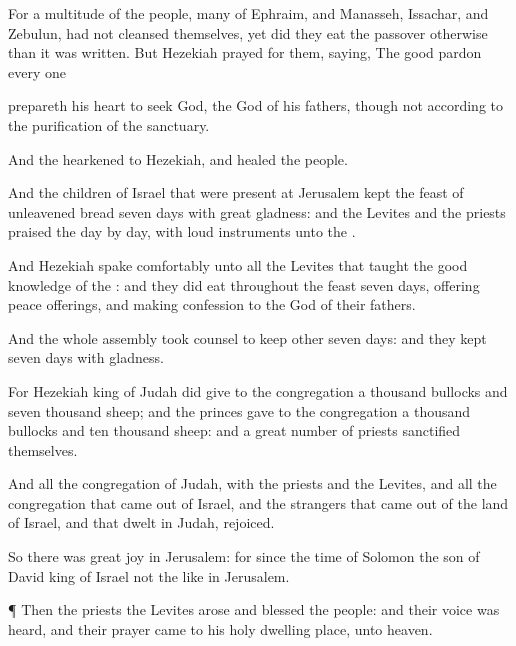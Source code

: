 {For a
multitude of the
people,
{}
many of
Ephraim, and
Manasseh,
Issachar, and
Zebulun, had
not
cleansed themselves, yet did they
eat the
passover otherwise than it was
written. But
Hezekiah
prayed for them,
saying, The
good
{}
pardon every one

prepareth his
heart to
seek
God, the
{}
God of his
fathers, though
{} not
{} according to the
purification of the
sanctuary.

And the
{}
hearkened to
Hezekiah, and
healed the
people.


\par }{\PP {}And the
children of
Israel that were
present at
Jerusalem
kept the
feast of unleavened
bread
seven
days with
great
gladness: and the
Levites and the
priests
praised the
{}
day by
day,
{} with
loud
instruments unto the
{}.

And
Hezekiah
spake
comfortably unto all the
Levites that
taught the
good
knowledge of the
{}: and they did
eat throughout the
feast
seven
days,
offering
peace
offerings, and making
confession to the
{}
God of their
fathers.

And the whole
assembly took
counsel to
keep
other
seven
days: and they
kept
{}
seven
days with
gladness.

For
Hezekiah
king of
Judah did
give to the
congregation a
thousand
bullocks and
seven
thousand
sheep; and the
princes
gave to the
congregation a
thousand
bullocks and
ten
thousand
sheep: and a great
number of
priests
sanctified themselves.

And all the
congregation of
Judah, with the
priests and the
Levites, and all the
congregation that came
out of
Israel, and the
strangers that came
out of the
land of
Israel, and that
dwelt in
Judah,
rejoiced.

So there was
great
joy in
Jerusalem: for since the
time of
Solomon the
son of
David
king of
Israel
{} not the like in
Jerusalem.


\par }{\PP {}¶ Then the
priests the
Levites
arose and
blessed the
people: and their
voice was
heard, and their
prayer
came
{} to his
holy dwelling
place,
{} unto
heaven.




}
